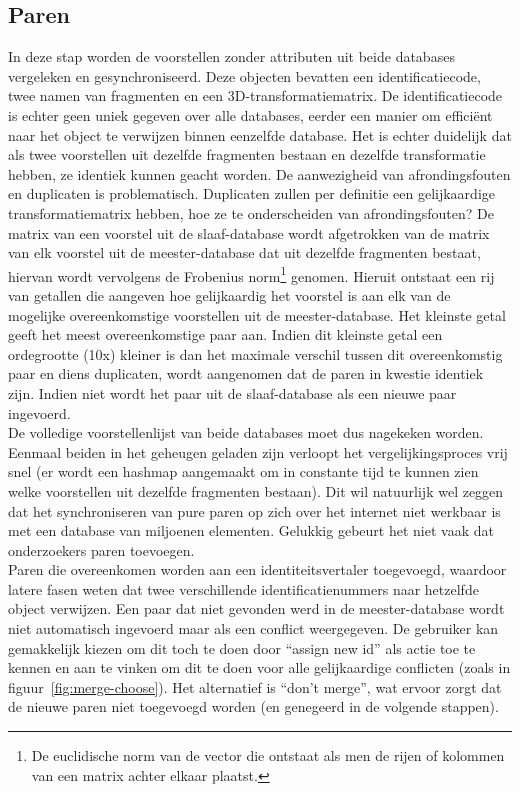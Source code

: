 \subsection{Paren}
In deze stap worden de voorstellen zonder attributen uit beide databases vergeleken en gesynchroniseerd. Deze objecten bevatten een identificatiecode, twee namen van fragmenten en een 3D-transformatiematrix. De identificatiecode is echter geen uniek gegeven over alle databases, eerder een manier om effici\"ent naar het object te verwijzen binnen eenzelfde database. Het is echter duidelijk dat als twee voorstellen uit dezelfde fragmenten bestaan en dezelfde transformatie hebben, ze identiek kunnen geacht worden. De aanwezigheid van afrondingsfouten en duplicaten is problematisch. Duplicaten zullen per definitie een gelijkaardige transformatiematrix hebben, hoe ze te onderscheiden van afrondingsfouten? De matrix van een voorstel uit de slaaf-database wordt afgetrokken van de matrix van elk voorstel uit de meester-database dat uit dezelfde fragmenten bestaat, hiervan wordt vervolgens de Frobenius norm\footnote{De euclidische norm van de vector die ontstaat als men de rijen of kolommen van een matrix achter elkaar plaatst.} genomen. Hieruit ontstaat een rij van getallen die aangeven hoe gelijkaardig het voorstel is aan elk van de mogelijke overeenkomstige voorstellen uit de meester-database. Het kleinste getal geeft het meest overeenkomstige paar aan. Indien dit kleinste getal een ordegrootte (10x) kleiner is dan het maximale verschil tussen dit overeenkomstig paar en diens duplicaten, wordt aangenomen dat de paren in kwestie identiek zijn. Indien niet wordt het paar uit de slaaf-database als een nieuwe paar ingevoerd.\\

De volledige voorstellenlijst van beide databases moet dus nagekeken worden. Eenmaal beiden in het geheugen geladen zijn verloopt het vergelijkingsproces vrij snel (er wordt een hashmap aangemaakt om in constante tijd te kunnen zien welke voorstellen uit dezelfde fragmenten bestaan). Dit wil natuurlijk wel zeggen dat het synchroniseren van pure paren op zich over het internet niet werkbaar is met een database van miljoenen elementen. Gelukkig gebeurt het niet vaak dat onderzoekers paren toevoegen.\\

Paren die overeenkomen worden aan een identiteitsvertaler toegevoegd, waardoor latere fasen weten dat twee verschillende identificatienummers naar hetzelfde object verwijzen. Een paar dat niet gevonden werd in de meester-database wordt niet automatisch ingevoerd maar als een conflict weergegeven. De gebruiker kan gemakkelijk kiezen om dit toch te doen door ``assign new id'' als actie toe te kennen en aan te vinken om dit te doen voor alle gelijkaardige conflicten (zoals in figuur~\ref{fig:merge-choose}). Het alternatief is ``don't merge'', wat ervoor zorgt dat de nieuwe paren niet toegevoegd worden (en genegeerd in de volgende stappen).

